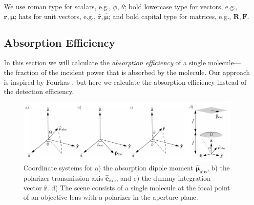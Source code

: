 \documentclass[10pt]{article}
\providecommand{\mb}[1]{\mathbf{#1}}
\providecommand{\mh}[1]{\mathbf{\hat{#1}}}
\providecommand{\bs}[1]{\boldsymbol{#1}}
\begin{document}
We use roman type for scalars, e.g., $\phi$, $\theta$; bold lowercase type for
vectors, e.g., $\mb{r}, \bs{\mu}$; hats for unit vectors, e.g.,
$\mh{r}, \hat{\bs{\mu}}$; and bold capital type for matrices, e.g.,
$\mb{R}, \mb{F}$.

\subsection{Absorption Efficiency}\label{excitation}
In this section we will calculate the \emph{absorption efficiency} of a single
molecule---the fraction of the incident power that is absorbed by the
molecule. Our approach is inspired by Fourkas \cite{fourkas2001}, but here we
calculate the absorption efficiency instead of the detection efficiency.

\begin{figure}[H]
\centering\includegraphics[width=\textwidth]{frames}
\caption{Coordinate systems for a) the absorption dipole moment
  $\hat{\bs{\mu}}_{\text{abs}}$, b) the polarizer transmission axis
  $\hat{\mb{e}}_{\text{exc}}$, and c) the dummy integration vector
  $\hat{\mb{r}}$. d) The scene consists of a single molecule at the focal point
  of an objective lens with a polarizer in the aperture plane.}
\label{fig:coordinates}
\end{figure}
\end{document}
